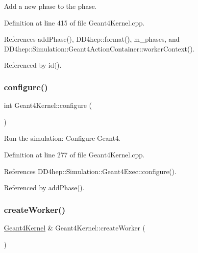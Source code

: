 Add a new phase to the phase. 



Definition at line 415 of file Geant4\+Kernel.\+cpp.



References add\+Phase(), D\+D4hep\+::format(), m\+\_\+phases, and D\+D4hep\+::\+Simulation\+::\+Geant4\+Action\+Container\+::worker\+Context().



Referenced by id().

\hypertarget{class_d_d4hep_1_1_simulation_1_1_geant4_kernel_ae48b44218f1a8115d8c7c105db17c43f}{}\label{class_d_d4hep_1_1_simulation_1_1_geant4_kernel_ae48b44218f1a8115d8c7c105db17c43f} 
\subsubsection{\texorpdfstring{configure()}{configure()}}
{\footnotesize\ttfamily int Geant4\+Kernel\+::configure (\begin{DoxyParamCaption}{ }\end{DoxyParamCaption})\hspace{0.3cm}{\ttfamily [virtual]}}



Run the simulation\+: Configure Geant4. 



Definition at line 277 of file Geant4\+Kernel.\+cpp.



References D\+D4hep\+::\+Simulation\+::\+Geant4\+Exec\+::configure().



Referenced by add\+Phase().

\hypertarget{class_d_d4hep_1_1_simulation_1_1_geant4_kernel_a8d5bfc7d22e12f711950bd1c64173b74}{}\label{class_d_d4hep_1_1_simulation_1_1_geant4_kernel_a8d5bfc7d22e12f711950bd1c64173b74} 
\subsubsection{\texorpdfstring{create\+Worker()}{createWorker()}}
{\footnotesize\ttfamily \hyperlink{class_d_d4hep_1_1_simulation_1_1_geant4_kernel}{Geant4\+Kernel} \& Geant4\+Kernel\+::create\+Worker (\begin{DoxyParamCaption}{ }\end{DoxyParamCaption})\hspace{0.3cm}{\ttfamily [virtual]}}



